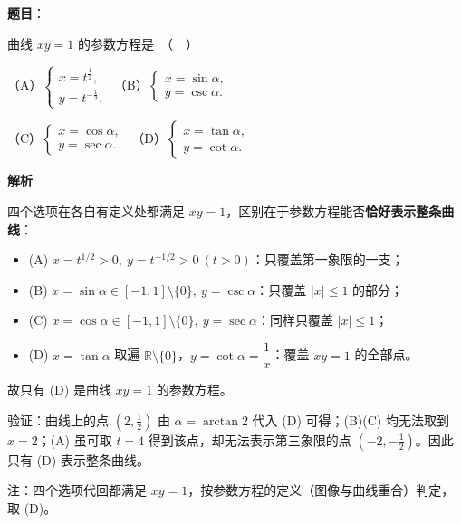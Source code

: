 \begin{answer}

\textbf{题目}：

曲线 $xy = 1$ 的参数方程是　（　）

（A）$\begin{cases} x = t^{\frac{1}{2}}, \\ y = t^{-\frac{1}{2}}. \end{cases}$　（B）$\begin{cases} x = \sin\alpha, \\ y = \csc\alpha. \end{cases}$

（C）$\begin{cases} x = \cos\alpha, \\ y = \sec\alpha. \end{cases}$　（D）$\begin{cases} x = \tan\alpha, \\ y = \cot\alpha. \end{cases}$

\textbf{解析}

四个选项在各自有定义处都满足 $xy=1$，区别在于参数方程能否\textbf{恰好表示整条曲线}：

\begin{itemize}
\item (A) $x=t^{1/2}>0,\ y=t^{-1/2}>0\ (t>0)$：只覆盖第一象限的一支；
\item (B) $x=\sin\alpha\in[-1,1]\setminus\{0\},\ y=\csc\alpha$：只覆盖 $|x|\le1$ 的部分；
\item (C) $x=\cos\alpha\in[-1,1]\setminus\{0\},\ y=\sec\alpha$：同样只覆盖 $|x|\le1$；
\item (D) $x=\tan\alpha$ 取遍 $\mathbb R\setminus\{0\}$，$y=\cot\alpha=\dfrac1x$：覆盖 $xy=1$ 的全部点。
\end{itemize}

故只有 (D) 是曲线 $xy=1$ 的参数方程。

验证：曲线上的点 $\left(2,\tfrac12\right)$ 由 $\alpha=\arctan 2$ 代入 (D) 可得；(B)(C) 均无法取到 $x=2$；(A) 虽可取 $t=4$ 得到该点，却无法表示第三象限的点 $(-2,-\tfrac12)$。因此只有 (D) 表示整条曲线。

注：四个选项代回都满足 $xy=1$，按参数方程的定义（图像与曲线重合）判定，取 (D)。


\par\medskip

\end{answer}
